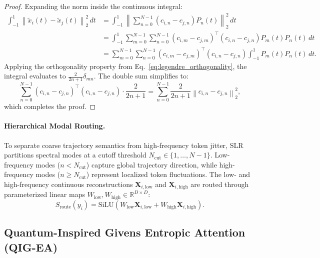 \documentclass{article}
\newcommand{\slr}{\textsc{SLR}\xspace}
\newcommand{\qigea}{\textsc{QIG-EA}\xspace}
\begin{document}
\begin{proof}
Expanding the norm inside the continuous integral:
\begin{align}
  \int_{-1}^1 \left\| \tilde{x}_i(t) - \tilde{x}_j(t) \right\|_2^2 \, dt &= \int_{-1}^1 \left\| \sum_{n=0}^{N-1} (c_{i,n} - c_{j,n}) P_n(t) \right\|_2^2 \, dt \\
  &= \int_{-1}^1 \sum_{m=0}^{N-1} \sum_{n=0}^{N-1} (c_{i,m} - c_{j,m})^\top (c_{i,n} - c_{j,n}) P_m(t) P_n(t) \, dt \\
  &= \sum_{m=0}^{N-1} \sum_{n=0}^{N-1} (c_{i,m} - c_{j,m})^\top (c_{i,n} - c_{j,n}) \int_{-1}^1 P_m(t) P_n(t) \, dt.
\end{align}
Applying the orthogonality property from Eq.~\eqref{eq:legendre_orthogonality}, the integral evaluates to $\frac{2}{2n+1} \delta_{mn}$. The double sum simplifies to:
\begin{equation}
  \sum_{n=0}^{N-1} (c_{i,n} - c_{j,n})^\top (c_{i,n} - c_{j,n}) \cdot \frac{2}{2n+1} = \sum_{n=0}^{N-1} \frac{2}{2n+1} \left\| c_{i,n} - c_{j,n} \right\|_2^2,
\end{equation}
which completes the proof.
\end{proof}

\paragraph{Hierarchical Modal Routing.}
To separate coarse trajectory semantics from high-frequency token jitter, \slr partitions spectral modes at a cutoff threshold $N_{\text{cut}} \in \{1, \dots, N-1\}$. Low-frequency modes ($n < N_{\text{cut}}$) capture global trajectory direction, while high-frequency modes ($n \ge N_{\text{cut}}$) represent localized token fluctuations. The low- and high-frequency continuous reconstructions $\mathbf{X}_{i, \text{low}}$ and $\mathbf{X}_{i, \text{high}}$ are routed through parameterized linear maps $W_{\text{low}}, W_{\text{high}} \in \mathbb{R}^{D \times D}$:
\begin{equation}
  S_{\text{route}}(y_i) = \text{SiLU} \left( W_{\text{low}} \mathbf{X}_{i, \text{low}} + W_{\text{high}} \mathbf{X}_{i, \text{high}} \right).
  \label{eq:slr_routing}
\end{equation}

\subsection{Quantum-Inspired Givens Entropic Attention (\qigea)}
\label{subsec:qigea_formulation}
\end{document}
